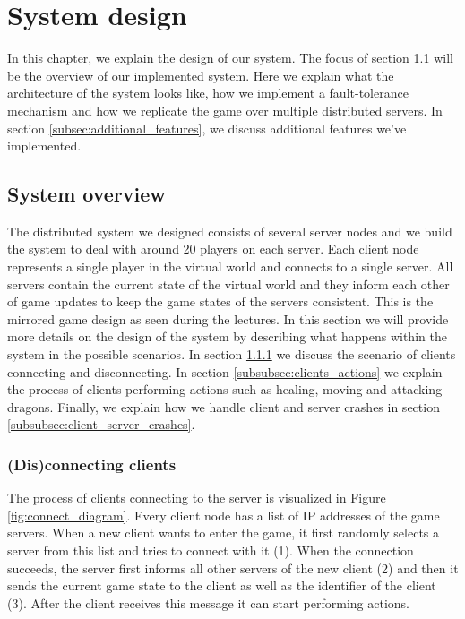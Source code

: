 \section{System design}
In this chapter, we explain the design of our system. The focus of section \ref{subsec:system_overview} will be the overview of our implemented system.
Here we explain what the architecture of the system looks like, how we implement a fault-tolerance mechanism and how we replicate the game over multiple distributed servers. 
In section \ref{subsec:additional_features}, we discuss additional features we've implemented.

\subsection{System overview}
\label{subsec:system_overview}
The distributed system we designed consists of several server nodes and we build the system to deal with around 20 players on each server. 
Each client node represents a single player in the virtual world and connects to a single server.
All servers contain the current state of the virtual world and they inform each other of game updates to keep the game states of the servers consistent. 
This is the mirrored game design as seen during the lectures. 
In this section we will provide more details on the design of the system by describing what happens within the system in the possible scenarios. 
In section \ref{subsubsec:disconnecting_clients} we discuss the scenario of clients connecting and disconnecting. 
In section \ref{subsubsec:clients_actions} we explain the process of clients performing actions such as healing, moving and attacking dragons. 
Finally, we explain how we handle client and server crashes in section \ref{subsubsec:client_server_crashes}.

\subsubsection{(Dis)connecting clients}
\label{subsubsec:disconnecting_clients}
The process of clients connecting to the server is visualized in Figure \ref{fig:connect_diagram}. 
Every client node has a list of IP addresses of the game servers. When a new client wants to enter the game, it first randomly selects a server from this list and tries to connect with it (1). 
When the connection succeeds, the server first informs all other servers of the new client (2) and then it sends the current game state to the client as well as the identifier of the client (3). 
After the client receives this message it can start performing actions.

